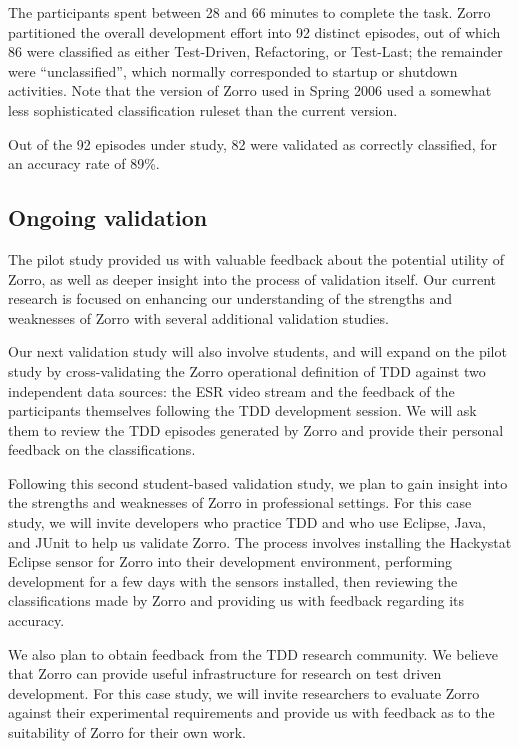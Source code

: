 \documentclass[11pt,twocolumn]{article}
\begin{document}
The participants spent between 28 and 66 minutes to complete the task.
Zorro partitioned the overall development effort into 92 distinct episodes,
out of which 86 were classified as either Test-Driven, Refactoring, or
Test-Last; the remainder were ``unclassified'', which normally corresponded
to startup or shutdown activities.  Note that the version of Zorro used in
Spring 2006 used a somewhat less sophisticated classification ruleset than
the current version.

Out of the 92 episodes under study, 82 were validated as correctly
classified, for an accuracy rate of 89\%.

\subsection{Ongoing validation}

The pilot study provided us with valuable feedback about the potential
utility of Zorro, as well as deeper insight into the process of validation
itself.  Our current research is focused on enhancing our understanding of
the strengths and weaknesses of Zorro with several additional validation
studies.

Our next validation study will also involve students, and will expand on
the pilot study by cross-validating the Zorro operational definition of TDD
against two independent data sources: the ESR video stream and the feedback
of the participants themselves following the TDD development session.  We
will ask them to review the TDD episodes generated by Zorro and provide
their personal feedback on the classifications.

Following this second student-based validation study, we plan to gain
insight into the strengths and weaknesses of Zorro in professional
settings.  For this case study, we will invite developers who
practice TDD and who use Eclipse, Java, and JUnit to help us validate
Zorro.  The process involves installing the Hackystat Eclipse sensor for
Zorro into their development environment, performing development for a few
days with the sensors installed, then reviewing the classifications made by
Zorro and providing us with feedback regarding its accuracy.

We also plan to obtain feedback from the TDD research community.  We believe
that Zorro can provide useful infrastructure for research on test driven
development.  For this case study, we will invite researchers to 
evaluate Zorro against their experimental requirements and provide us with 
feedback as to the suitability of Zorro for their own work. 
\end{document}
